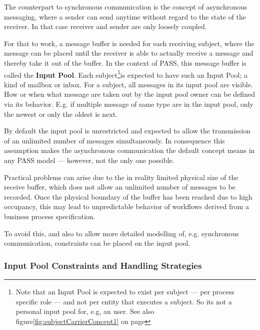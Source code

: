 The counterpart to synchronous communication is the concept of asynchronous messaging, where a sender can send anytime without regard to the state of the receiver. In that case receiver and sender are only loosely coupled. 

For that to work, a message buffer is needed for each receiving subject, where the message can be placed until the receiver is able to actually receive a message and thereby take it out of the buffer. In the context of PASS, this message buffer is called the \textbf{Input Pool}. Each subject\footnote{Note that an Input Pool is expected to exist per subject --- per process specific role --- and not per entity that executes a subject. So its not a personal input pool for, e.g, an user. See also figure\ref{fig:subjectCarrierConcept1} on page \pageref{fig:subjectCarrierConcept1} }is expected to have such an Input Pool; a kind of mailbox or inbox. For a subject, all messages in its input pool are visible. How or when what message are taken out by the input pool owner can be defined via its behavior. E.g. if multiple message of same type are in the input pool, only the newest or only the oldest is next.


By default the input pool is unrestricted and expected to allow the transmission of an unlimited number of messages simultaneously. In consequence this assumption makes the asynchronous communication the default concept means in any PASS model --- however, not the only one possible.

Practical problems can arise due to the in reality limited physical size of the receive buffer, which does not allow an unlimited number of messages to be recorded. Once the physical boundary of the buffer has been reached due to high occupancy, this may lead to unpredictable behavior of workflows derived from a business process specification. 

To avoid this, and also to allow more detailed modelling of, e.g. synchronous communication, constraints can be placed on the input pool. 

\subsubsection{ Input Pool Constraints and Handling Strategies}
\label{sec: inputpool}

